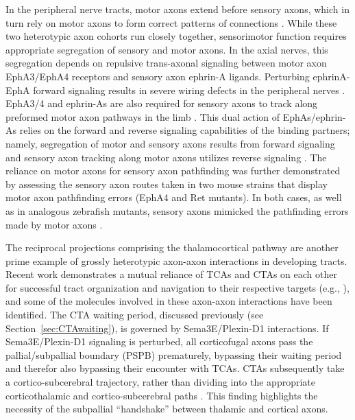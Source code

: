 In the peripheral nerve tracts, motor axons extend before sensory axons, which in turn rely on motor axons to form correct patterns of connections \cite{wang2013axons}.
While these two heterotypic axon cohorts run closely together, sensorimotor function requires appropriate segregation of sensory and motor axons.
In the axial nerves, this segregation depends on repulsive trans-axonal signaling between motor axon EphA3/EphA4 receptors and sensory axon ephrin-A ligands.
Perturbing ephrinA-EphA forward signaling results in severe wiring defects in the peripheral nerves \cite{gallarda2008segregation}.
EphA3/4 and ephrin-As are also required for sensory axons to track along preformed motor axon pathways in the limb \cite{wang2011anatomical}.
This dual action of EphAs/ephrin-As relies on the forward and reverse signaling capabilities of the binding partners; namely, segregation of motor and sensory axons results from forward signaling and sensory axon tracking along motor axons utilizes reverse signaling \cite{wang2011anatomical}.
The reliance on motor axons for sensory axon pathfinding was further demonstrated by assessing the sensory axon routes taken in two mouse strains that display motor axon pathfinding errors (EphA4 and Ret mutants).
In both cases, as well as in analogous zebrafish mutants, sensory axons mimicked the pathfinding errors made by motor axons \cite{wang2014conserved}.

The reciprocal projections comprising the thalamocortical pathway are another prime example of grossly heterotypic axon-axon interactions in developing tracts.
Recent work demonstrates a mutual reliance of TCAs and CTAs on each other for successful tract organization and navigation to their respective targets (e.g., ), and some of the molecules involved in these axon-axon interactions have been identified.
The CTA waiting period, discussed previously (see Section~\ref{sec:CTAwaiting}), is governed by Sema3E/Plexin-D1 interactions.
If Sema3E/Plexin-D1 signaling is perturbed, all corticofugal axons pass the pallial/subpallial boundary (PSPB) prematurely, bypassing their waiting period and therefor also bypassing their encounter with TCAs.
CTAs subsequently take a cortico-subcerebral trajectory, rather than dividing into the appropriate corticothalamic and cortico-subcerebral paths \cite{deck2013pathfinding}.
This finding highlights the necessity of the subpallial ``handshake'' between thalamic and cortical axons.

